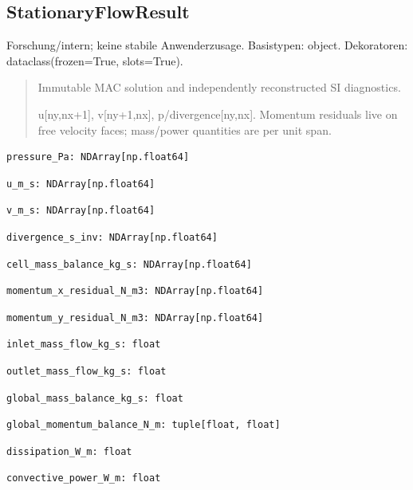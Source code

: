\subsection{StationaryFlowResult}
Forschung/intern; keine stabile Anwenderzusage.
Basistypen: object. Dekoratoren: dataclass(frozen=True, slots=True).
\begin{quote}
Immutable MAC solution and independently reconstructed SI diagnostics.\par u[ny,nx+1], v[ny+1,nx], p/divergence[ny,nx]. Momentum residuals live on free velocity faces; mass/power quantities are per unit span.
\end{quote}
\begin{lstlisting}
pressure_Pa: NDArray[np.float64]
\end{lstlisting}
\begin{lstlisting}
u_m_s: NDArray[np.float64]
\end{lstlisting}
\begin{lstlisting}
v_m_s: NDArray[np.float64]
\end{lstlisting}
\begin{lstlisting}
divergence_s_inv: NDArray[np.float64]
\end{lstlisting}
\begin{lstlisting}
cell_mass_balance_kg_s: NDArray[np.float64]
\end{lstlisting}
\begin{lstlisting}
momentum_x_residual_N_m3: NDArray[np.float64]
\end{lstlisting}
\begin{lstlisting}
momentum_y_residual_N_m3: NDArray[np.float64]
\end{lstlisting}
\begin{lstlisting}
inlet_mass_flow_kg_s: float
\end{lstlisting}
\begin{lstlisting}
outlet_mass_flow_kg_s: float
\end{lstlisting}
\begin{lstlisting}
global_mass_balance_kg_s: float
\end{lstlisting}
\begin{lstlisting}
global_momentum_balance_N_m: tuple[float, float]
\end{lstlisting}
\begin{lstlisting}
dissipation_W_m: float
\end{lstlisting}
\begin{lstlisting}
convective_power_W_m: float
\end{lstlisting}
